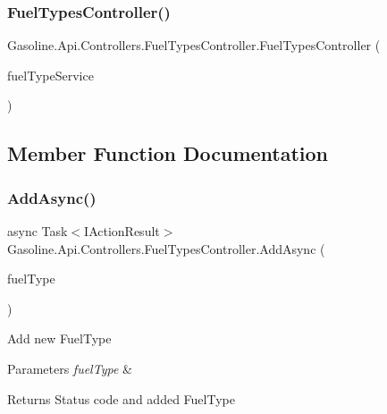 \subsubsection{\texorpdfstring{FuelTypesController()}{FuelTypesController()}}
{\footnotesize\ttfamily Gasoline.\+Api.\+Controllers.\+Fuel\+Types\+Controller.\+Fuel\+Types\+Controller (\begin{DoxyParamCaption}\item[{\mbox{\hyperlink{class_gasoline_1_1_data_1_1_services_1_1_fuel_type_service}{Fuel\+Type\+Service}}}]{fuel\+Type\+Service }\end{DoxyParamCaption})}



\subsection{Member Function Documentation}
\mbox{\label{class_gasoline_1_1_api_1_1_controllers_1_1_fuel_types_controller_ab8bb8c3e14d71a2b87335f0cd84274e3}} 
\subsubsection{\texorpdfstring{AddAsync()}{AddAsync()}}
{\footnotesize\ttfamily async Task$<$I\+Action\+Result$>$ Gasoline.\+Api.\+Controllers.\+Fuel\+Types\+Controller.\+Add\+Async (\begin{DoxyParamCaption}\item[{\mbox{[}\+From\+Body\mbox{]} \mbox{\hyperlink{class_gasoline_1_1_data_1_1_models_1_1_fuel_type}{Fuel\+Type}}}]{fuel\+Type }\end{DoxyParamCaption})}



Add new Fuel\+Type 


\begin{DoxyParams}{Parameters}
{\em fuel\+Type} & \\
\hline
\end{DoxyParams}
\begin{DoxyReturn}{Returns}
Status code and added Fuel\+Type
\end{DoxyReturn}
\mbox{\label{class_gasoline_1_1_api_1_1_controllers_1_1_fuel_types_controller_a49f976d4cfeeb60fc4c3028833a11d4e}} 
